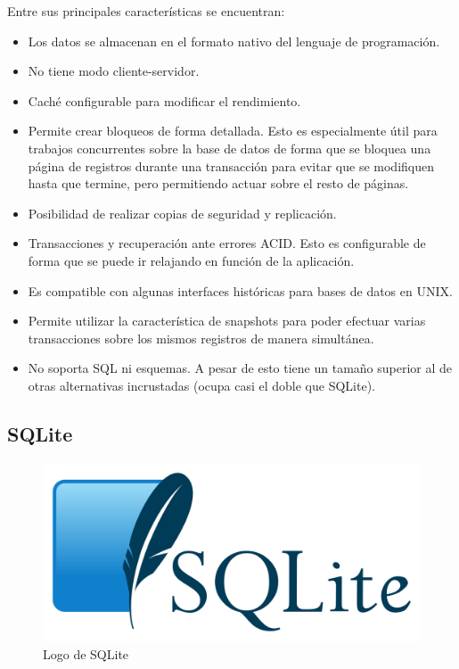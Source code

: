 Entre sus principales características se encuentran: 
\begin{itemize}


\item	Los datos se almacenan en el formato nativo del lenguaje de programación.
\item	No tiene modo cliente-servidor.
\item	Caché configurable para modificar el rendimiento.
\item	Permite crear bloqueos de forma detallada. Esto es especialmente útil para trabajos concurrentes sobre la base de datos de forma que se bloquea una página de registros durante una transacción para evitar que se modifiquen hasta que termine, pero permitiendo actuar sobre el resto de páginas.
\item	Posibilidad de realizar copias de seguridad y replicación.
\item	Transacciones y recuperación ante errores ACID. Esto es configurable de forma que se puede ir relajando en función de la aplicación.
\item	Es compatible con algunas interfaces históricas para bases de datos en UNIX.
\item	Permite utilizar la característica de snapshots para poder efectuar varias transacciones sobre los mismos registros de manera simultánea.
\item	No soporta SQL ni esquemas. A pesar de esto tiene un tamaño superior al de otras alternativas incrustadas (ocupa casi el doble que SQLite).
\end{itemize}

\subsection{SQLite}\label{chapter:introduction}



\begin{figure}[h!]
\begin{center}
\includegraphics[scale=0.08]{Graphics/images/LogodeSQLite.png}
\caption{Logo de SQLite}
\label{fig:sql}

\end{center}
\end{figure}


